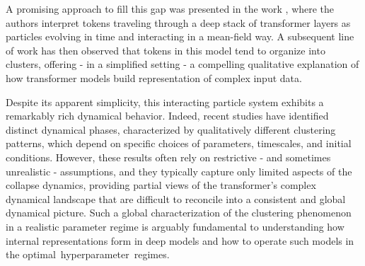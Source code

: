 \documentclass{article}
\numberwithin{theorem}{section}
\begin{document}
A promising approach to fill this gap was presented in the work \cite{sander2022sinkformers}, where the authors interpret tokens traveling through a deep stack of transformer layers as particles evolving in time and interacting in a mean-field way.
 A subsequent line of work \cite{geshkovski2024emergence} has then observed that tokens in this model tend to organize into clusters, offering - in a simplified setting - a compelling qualitative explanation of how transformer models build representation of complex input data.

Despite its apparent simplicity, this interacting particle system exhibits a remarkably rich dynamical behavior. Indeed, recent studies have identified distinct dynamical phases, characterized by qualitatively different clustering patterns, which depend on specific choices of parameters, timescales, and initial conditions. However, these results often rely on restrictive - and sometimes unrealistic - assumptions, and they typically capture only limited aspects of the collapse dynamics, providing partial views of the transformer's complex dynamical landscape that are difficult to reconcile into a consistent and global dynamical picture.
Such a global characterization of the  clustering phenomenon in a realistic parameter regime is arguably fundamental to understanding how internal representations form in deep models and how to operate such models in the optimal~hyperparameter~regimes. 
\end{document}
